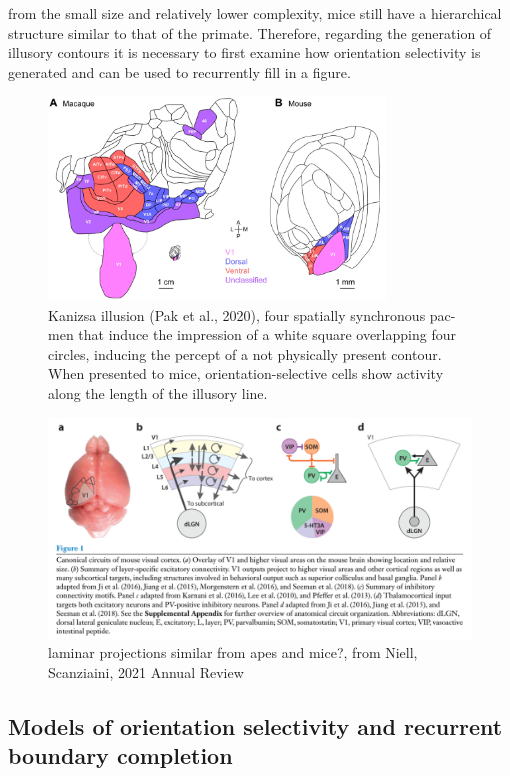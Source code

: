 \documentclass[12pt]{article}
\begin{document}
from the small size and relatively lower complexity, mice still have a hierarchical structure similar to that of the primate. Therefore, regarding the generation of illusory contours it is necessary to first examine how orientation selectivity is generated and can be used to recurrently fill in a figure.

\begin{figure}[H]
  \centering
  \includegraphics[width=0.8\textwidth]{figures/compared_cortex.png}
  \caption{Kanizsa illusion (Pak et al., 2020), four spatially synchronous pac-men that induce the impression of a white square overlapping four circles, inducing the percept of a not physically present contour. When presented to mice, orientation-selective cells show activity along the length of the illusory line.}
  \label{fig:simple_abutting}
\end{figure}

\begin{figure}[H]
  \centering
  \includegraphics[width=0.8 \textwidth]{figures/Canonical_laminar_projection.png}
  \caption{laminar projections similar from apes and mice?, from Niell, Scanziaini, 2021 Annual Review}
  \label{fig:figure 3}
\end{figure}


\subsection{Models of orientation selectivity and recurrent boundary completion}
\end{document}
